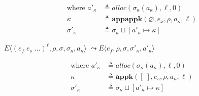 \documentclass[12pt,draft]{article}
\begin{document}
{\begin{multicols*}{2}
\begin{align*}
  \text{where }
  a'_\kappa &\triangleq alloc(\sigma_\kappa(a_\kappa), \ell, 0) \\
  \kappa &\triangleq \textbf{appappk}(\varnothing, e_x, \rho, a_\kappa, \ell) \\
  \sigma'_\kappa &\triangleq \sigma_\kappa \sqcup [a'_\kappa \mapsto \kappa]
\end{align*}
\begin{center}
  $E\langle (e_f\;e_s\;...)^\ell , \rho , \sigma , \sigma_\kappa , a_\kappa \rangle$
  $\leadsto E\langle e_f , \rho , \sigma , \sigma'_\kappa , a'_\kappa \rangle$
\end{center}
\vspace{-5mm}
\begin{align*}
  \text{where }
  a'_\kappa &\triangleq alloc(\sigma_\kappa(a_\kappa), \ell, 0) \\
  \kappa &\triangleq \textbf{appk}([\;], e_s, \rho, a_\kappa, \ell) \\
  \sigma'_\kappa &\triangleq \sigma_\kappa \sqcup [a'_\kappa \mapsto \kappa]
\end{align*}
\end{multicols*}
} %


\newpage
\end{document}
